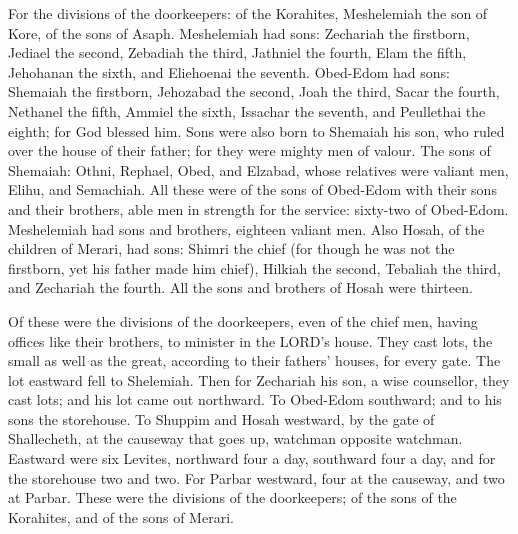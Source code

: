  For the divisions of the doorkeepers: of the Korahites,
Meshelemiah the son of Kore, of the sons of Asaph. 
Meshelemiah had sons: Zechariah the firstborn, Jediael the second,
Zebadiah the third, Jathniel the fourth,  Elam the fifth,
Jehohanan the sixth, and Eliehoenai the seventh. 
Obed-Edom had sons: Shemaiah the firstborn, Jehozabad the second, Joah
the third, Sacar the fourth, Nethanel the fifth,  Ammiel
the sixth, Issachar the seventh, and Peullethai the eighth; for God
blessed him.  Sons were also born to Shemaiah his son, who
ruled over the house of their father; for they were mighty men of
valour.  The sons of Shemaiah: Othni, Rephael, Obed, and
Elzabad, whose relatives were valiant men, Elihu, and Semachiah.
 All these were of the sons of Obed-Edom with their sons
and their brothers, able men in strength for the service: sixty-two of
Obed-Edom.  Meshelemiah had sons and brothers, eighteen
valiant men.  Also Hosah, of the children of Merari, had
sons: Shimri the chief (for though he was not the firstborn, yet his
father made him chief),  Hilkiah the second, Tebaliah the
third, and Zechariah the fourth. All the sons and brothers of Hosah were
thirteen.

 Of these were the divisions of the doorkeepers, even of
the chief men, having offices like their brothers, to minister in the
LORD's house.  They cast lots, the small as well as the
great, according to their fathers' houses, for every gate.
 The lot eastward fell to Shelemiah. Then for Zechariah
his son, a wise counsellor, they cast lots; and his lot came out
northward.  To Obed-Edom southward; and to his sons the
storehouse.  To Shuppim and Hosah westward, by the gate
of Shallecheth, at the causeway that goes up, watchman opposite
watchman.  Eastward were six Levites, northward four a
day, southward four a day, and for the storehouse two and two.
 For Parbar westward, four at the causeway, and two at
Parbar.  These were the divisions of the doorkeepers; of
the sons of the Korahites, and of the sons of Merari.

